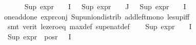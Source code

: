\begin{isabellebody}
\ \ \ \ \isamarkupfalse%
\ {\isacartoucheopen}Sup\ {\isacharparenleft}{\kern0pt}{\isacharparenleft}{\kern0pt}expr{\isacharunderscore}{\kern0pt}{}\ {\isasymcirc}\ {\isasymPhi}{\isacharparenright}{\kern0pt}\ {\isacharbackquote}{\kern0pt}\ I{\isacharparenright}{\kern0pt}\ {\isasymle}\ {}{\isacartoucheclose}\ {\isacartoucheopen}Sup\ {\isacharparenleft}{\kern0pt}{\isacharparenleft}{\kern0pt}expr{\isacharunderscore}{\kern0pt}{}\ {\isasymcirc}\ {\isasymPhi}{\isacharparenright}{\kern0pt}\ {\isacharbackquote}{\kern0pt}\ J{\isacharparenright}{\kern0pt}\ {\isasymle}\ {}{\isacartoucheclose}\ {\isacartoucheopen}Sup\ {\isacharparenleft}{\kern0pt}{\isacharparenleft}{\kern0pt}expr{\isacharunderscore}{\kern0pt}{}\ {\isasymcirc}\ {\isasymPhi}{\isacharparenright}{\kern0pt}\ {\isacharbackquote}{\kern0pt}\ I{\isacharparenright}{\kern0pt}\ {\isasymle}\ {}{\isacartoucheclose}\ \isanewline
one{\isacharunderscore}{\kern0pt}add{\isacharunderscore}{\kern0pt}one\ expr{\isacharunderscore}{\kern0pt}{}{\isacharunderscore}{\kern0pt}conj\ Sup{\isacharunderscore}{\kern0pt}union{\isacharunderscore}{\kern0pt}distrib\ add{\isacharunderscore}{\kern0pt}left{\isacharunderscore}{\kern0pt}mono\ le{\isacharunderscore}{\kern0pt}sup{\isacharunderscore}{\kern0pt}iff\isanewline
\ \ \ \ \isamarkupfalse%
\ {\isacharparenleft}{\kern0pt}smt\ {\isacharparenleft}{\kern0pt}verit{\isacharparenright}{\kern0pt}\ le{\isacharunderscore}{\kern0pt}zero{\isacharunderscore}{\kern0pt}eq\ max{\isacharunderscore}{\kern0pt}def\ sup{\isacharunderscore}{\kern0pt}enat{\isacharunderscore}{\kern0pt}def{\isacharparenright}{\kern0pt}\isanewline
\ \ \isamarkupfalse%
\ {\isacartoucheopen}Sup\ {\isacharparenleft}{\kern0pt}{\isacharparenleft}{\kern0pt}expr{\isacharunderscore}{\kern0pt}{}\ {\isasymcirc}\ {\isasymPhi}{\isacharparenright}{\kern0pt}\ {\isacharbackquote}{\kern0pt}\ I{\isacharparenright}{\kern0pt}\ {\isasymle}\ {}{\isacartoucheclose}\ \isamarkupfalse%
\ {\isachardoublequoteopen}Sup\ {\isacharparenleft}{\kern0pt}expr{\isacharunderscore}{\kern0pt}{}\ {\isacharbackquote}{\kern0pt}\ {\isacharparenleft}{\kern0pt}pos{\isacharunderscore}{\kern0pt}r\ {\isacharparenleft}{\kern0pt}{\isasymPhi}\ {\isacharbackquote}{\kern0pt}\ I{\isacharparenright}{\kern0pt}{\isacharparenright}{\kern0pt}{\isacharparenright}{\kern0pt}\ {\isacharless}{\kern0pt}{\isacharequal}{\kern0pt}\ {}{\isachardoublequoteclose}\ \isanewline
\ \ \ \ \isamarkupfalse%

\end{isabellebody}
